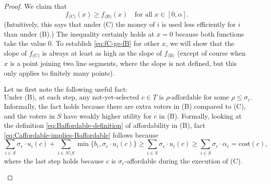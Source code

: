 \documentclass[10pt]{scrartcl}
\renewcommand*{\le}{\leqslant}
\renewcommand*{\ge}{\geqslant}
\newcommand{\cost}{{{\mathrm{cost}}}}
\theoremstyle{definition}
\theoremstyle{plain}
\begin{document}
\begin{proof}
	We claim that 
	\begin{equation}
		\label{eq:fC-ge-fB}
		f_{\text{(C)}}(x) \ge f_{\text{(B)}}(x) \quad \text{for all $x \in [0, \alpha]$.}	
	\end{equation}
	(Intuitively, this says that under (C) the money of $i$ is used less efficiently for $i$ than under (B).) The inequality certainly holds at $x = 0$ because both functions take the value $0$. To establish \eqref{eq:fC-ge-fB} for other $x$, we will show that the slope of $f_{\text{(C)}}$ is always at least as high as the slope of $f_{\text{(B)}}$ (except of course when $x$ is a point joining two line segments, where the slope is not defined, but this only applies to finitely many points).
	
	Let us first note the following useful fact:
	\begin{equation}
		\label{eq:Caffordable-implies-Baffordable}
		\text{Under (B), at each step, any not-yet-selected $c \in T$ is $\rho$-affordable for some $\rho \le \sigma_c$.}
	\end{equation}
	Informally, the fact holds because there are extra voters in (B) compared to (C), and the voters in $S$ have weakly higher utility for $c$ in (B).
	Formally, looking at the definition \eqref{eq:Baffordable-definition} of affordability in (B), fact \eqref{eq:Caffordable-implies-Baffordable} follows because
	\[
	\sum_{i \in S} \sigma_c \cdot u_i(c) + \sum_{i \in N \setminus S} \min\{b_i, \sigma_c \cdot u_i(c)\} \ge \sum_{i \in S} \sigma_c \cdot u_i(c) \ge \sum_{i \in S} \sigma_c \cdot \alpha_c = \cost(c),
	\]
	where the last step holds because $c$ is $\sigma_c$-affordable during the execution of (C).
	
	\begin{figure}[ht]
		\centering
\end{figure}
\end{proof}
\end{document}
